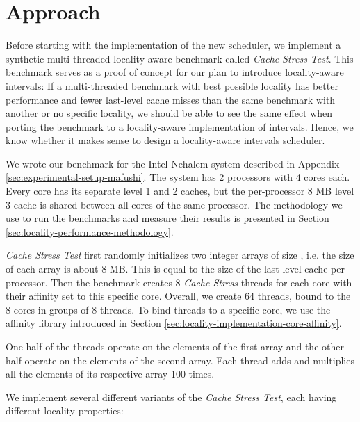 
\chapter{Approach}
\label{chap:locality-approach}

Before starting with the implementation of the new scheduler, we
implement a synthetic multi-threaded locality-aware benchmark called
\emph{Cache Stress Test}. This benchmark serves as a proof of concept
for our plan to introduce locality-aware intervals: If a
multi-threaded benchmark with best possible locality has better
performance and fewer last-level cache misses than the same benchmark
with another or no specific locality, we should be able to see the
same effect when porting the benchmark to a locality-aware
implementation of intervals. Hence, we know whether it makes sense to
design a locality-aware intervals scheduler.

We wrote our benchmark for the Intel Nehalem system described in
Appendix \ref{sec:experimental-setup-mafushi}. The system has 2
processors with 4 cores each. Every core has its separate level 1 and
2 caches, but the per-processor 8 MB level 3 cache is shared between
all cores of the same processor. The methodology we use to run the
benchmarks and measure their results is presented in Section
\ref{sec:locality-performance-methodology}.

\emph{Cache Stress Test} first randomly initializes two integer arrays
of size , i.e. the size of each array is about 8
MB. This is equal to the size of the last level cache per
processor. Then the benchmark creates 8 \emph{Cache Stress} threads
for each core with their affinity set to this specific core. Overall,
we create 64 threads, bound to the 8 cores in groups of 8 threads. To
bind threads to a specific core, we use the affinity library
introduced in Section \ref{sec:locality-implementation-core-affinity}.

One half of the threads operate on the elements of the first array and
the other half operate on the elements of the second array. Each
thread adds and multiplies all the elements of its respective array
100 times.

We implement several different variants of the \emph{Cache Stress
  Test}, each having different locality properties:

